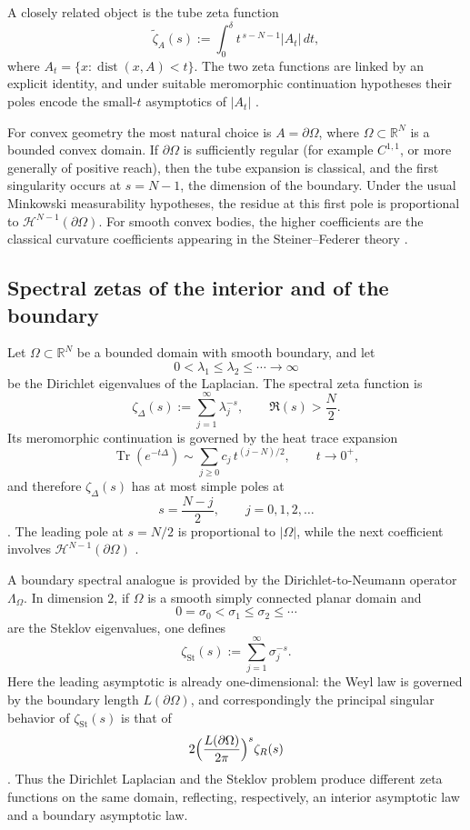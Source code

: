 \documentclass[a4paper,american,11pt]{amsart}
\theoremstyle{plain}
\theoremstyle{definition}
\begin{document}
A closely related object is the tube zeta function
\[
\widetilde\zeta_A(s):=\int_0^\delta t^{\,s-N-1}|A_t|\,dt,
\]
where \(A_t=\{x:\operatorname{dist}(x,A)<t\}\). The two zeta functions are linked by an explicit identity, and under suitable meromorphic continuation hypotheses their poles encode the small-\(t\) asymptotics of \(|A_t|\) \cite{LapidusRadunovicZubrinic2017JMAA,LapidusRadunovicZubrinic2017}.

For convex geometry the most natural choice is \(A=\partial\Omega\), where \(\Omega\subset\mathbb R^N\) is a bounded convex domain. If \(\partial\Omega\) is sufficiently regular (for example \(C^{1,1}\), or more generally of positive reach), then the tube expansion is classical, and the first singularity occurs at \(s=N-1\), the dimension of the boundary. Under the usual Minkowski measurability hypotheses, the residue at this first pole is proportional to \(\mathcal H^{N-1}(\partial\Omega)\). For smooth convex bodies, the higher coefficients are the classical curvature coefficients appearing in the Steiner--Federer theory \cite{Federer1959,LapidusRadunovicZubrinic2017}.

\subsection{Spectral zetas of the interior and of the boundary}

Let \(\Omega\subset\mathbb R^N\) be a bounded domain with smooth boundary, and let
\[
0<\lambda_1\le \lambda_2\le\cdots\to\infty
\]
be the Dirichlet eigenvalues of the Laplacian. The spectral zeta function is
\[
\zeta_\Delta(s):=\sum_{j=1}^\infty \lambda_j^{-s},
\qquad \Re(s)>\frac N2.
\]
Its meromorphic continuation is governed by the heat trace expansion
\[
\operatorname{Tr}(e^{-t\Delta})\sim \sum_{j\ge0} c_j\, t^{(j-N)/2},
\qquad t\to0^+,
\]
and therefore \(\zeta_\Delta(s)\) has at most simple poles at
\[
s=\frac{N-j}{2},\qquad j=0,1,2,\dots
\]
\cite{MinakshisundaramPleijel1949,Seeley1967}. The leading pole at \(s=N/2\) is proportional to \(|\Omega|\), while the next coefficient involves \(\mathcal H^{N-1}(\partial\Omega)\) \cite{MinakshisundaramPleijel1949,Seeley1967}.

A boundary spectral analogue is provided by the Dirichlet-to-Neumann operator \(\Lambda_\Omega\). In dimension \(2\), if \(\Omega\) is a smooth simply connected planar domain and
\[
0=\sigma_0<\sigma_1\le\sigma_2\le\cdots
\]
are the Steklov eigenvalues, one defines
\[
\zeta_{\mathrm{St}}(s):=\sum_{j=1}^\infty \sigma_j^{-s}.
\]
Here the leading asymptotic is already one-dimensional: the Weyl law is governed by the boundary length \(L(\partial\Omega)\), and correspondingly the principal singular behavior of \(\zeta_{\mathrm{St}}(s)\) is that of
\[
2\Bigl(\frac{L(\partial\Omega)}{2\pi}\Bigr)^s \zeta_R(s)
\]
\cite{GirouardParnovskiPolterovichSher2014,JollivetSharafutdinov2018,JollivetSharafutdinov2021}. Thus the Dirichlet Laplacian and the Steklov problem produce different zeta functions on the same domain, reflecting, respectively, an interior asymptotic law and a boundary asymptotic law.
\end{document}
